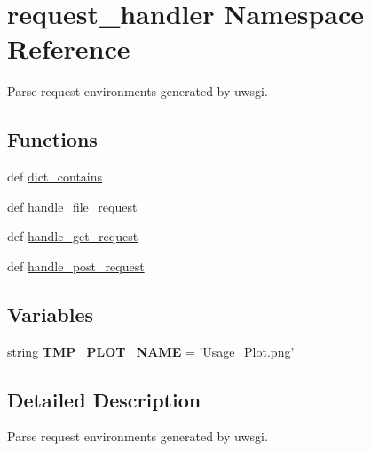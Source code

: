\hypertarget{namespacerequest__handler}{\section{request\-\_\-handler Namespace Reference}
\label{namespacerequest__handler}
}


Parse request environments generated by uwsgi.  


\subsection*{Functions}
\begin{DoxyCompactItemize}
\item 
def \hyperlink{namespacerequest__handler_acbe40eb87931af25d08ca11f9f56b20b}{dict\-\_\-contains}
\item 
def \hyperlink{namespacerequest__handler_a0ea7112be57c3bc38ba259da2230e787}{handle\-\_\-file\-\_\-request}
\item 
def \hyperlink{namespacerequest__handler_ae85d99838a4763bed778794cf8c6d634}{handle\-\_\-get\-\_\-request}
\item 
def \hyperlink{namespacerequest__handler_ad85c3eb54be5481991ae743dcb3a8eda}{handle\-\_\-post\-\_\-request}
\end{DoxyCompactItemize}
\subsection*{Variables}
\begin{DoxyCompactItemize}
\item 
\hypertarget{namespacerequest__handler_ad7a4fd47911d277f54651587bbe2b81d}{string {\bfseries T\-M\-P\-\_\-\-P\-L\-O\-T\-\_\-\-N\-A\-M\-E} = 'Usage\-\_\-\-Plot.\-png'}\label{namespacerequest__handler_ad7a4fd47911d277f54651587bbe2b81d}

\end{DoxyCompactItemize}


\subsection{Detailed Description}
Parse request environments generated by uwsgi. 

